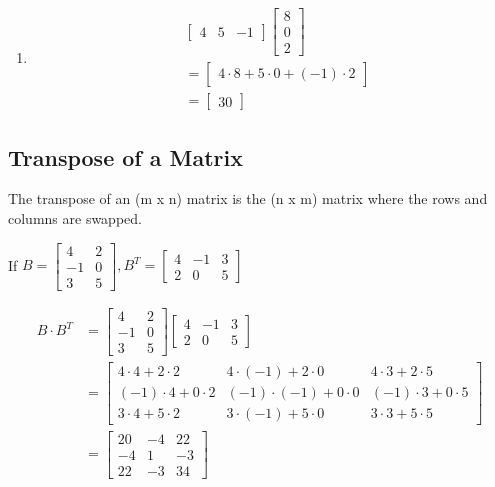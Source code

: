 \documentclass[
  letterpaper,
  DIV=11,
  numbers=noendperiod]{scrartcl}
\begin{document}
\begin{enumerate}
\item
  \begin{align*}
  &\begin{bmatrix}4 & 5 & -1 \end{bmatrix}\begin{bmatrix} 8 \\ 0 \\ 2\end{bmatrix} \\
  &= \begin{bmatrix} 4 \cdot 8 + 5 \cdot 0 + (-1) \cdot 2 \end{bmatrix} \\
  &= \begin{bmatrix} 30 \end{bmatrix}
  \end{align*}
\end{enumerate}

\hypertarget{transpose-of-a-matrix}{%
\subsection{Transpose of a Matrix}\label{transpose-of-a-matrix}}

The transpose of an (m x n) matrix is the (n x m) matrix where the rows
and columns are swapped.

If
\(B = \begin{bmatrix} 4 & 2 \\ -1 & 0 \\ 3 & 5 \end{bmatrix}, B^T = \begin{bmatrix} 4 & -1 & 3 \\ 2 & 0 & 5 \end{bmatrix}\)

\begin{align*}
B \cdot B^T &= \begin{bmatrix} 4 & 2 \\ -1 & 0 \\ 3 & 5 \end{bmatrix} \begin{bmatrix} 4 & -1 & 3 \\ 2 & 0 & 5 \end{bmatrix} \\ 
&= \begin{bmatrix} 4 \cdot 4 + 2 \cdot 2 & 4 \cdot (-1) + 2 \cdot 0 & 4 \cdot 3 + 2 \cdot 5 \\ (-1) \cdot 4 + 0 \cdot 2 & (-1) \cdot (-1) + 0 \cdot 0 & (-1) \cdot 3 + 0 \cdot 5 \\ 3 \cdot 4 + 5 \cdot 2 & 3 \cdot (-1) + 5 \cdot 0 & 3 \cdot 3 + 5 \cdot 5 \end{bmatrix} \\ 
&= \begin{bmatrix} 20 & -4 & 22 \\ -4 & 1 & -3 \\ 22 & -3 & 34\end{bmatrix}
\end{align*}
\end{document}
